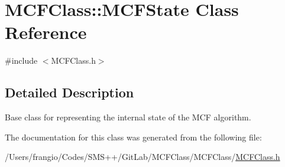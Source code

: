 \hypertarget{class_m_c_f_class_1_1_m_c_f_state}{}\section{M\+C\+F\+Class\+:\+:M\+C\+F\+State Class Reference}
\label{class_m_c_f_class_1_1_m_c_f_state}


{\ttfamily \#include $<$M\+C\+F\+Class.\+h$>$}



\subsection{Detailed Description}
Base class for representing the internal state of the M\+CF algorithm. 

The documentation for this class was generated from the following file\+:\begin{DoxyCompactItemize}
\item 
/\+Users/frangio/\+Codes/\+S\+M\+S++/\+Git\+Lab/\+M\+C\+F\+Class/\+M\+C\+F\+Class/\mbox{\hyperlink{_m_c_f_class_8h}{M\+C\+F\+Class.\+h}}\end{DoxyCompactItemize}
